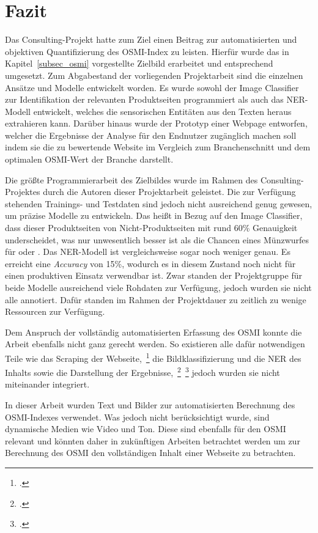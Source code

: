 \section{Fazit}
Das Consulting-Projekt hatte zum Ziel einen Beitrag zur automatisierten und objektiven Quantifizierung des
\ac{OSMI}-Index zu leisten.
Hierfür wurde das in Kapitel~\ref{subsec_osmi} vorgestellte Zielbild erarbeitet und entsprechend umgesetzt.
Zum Abgabestand der vorliegenden Projektarbeit sind die einzelnen Ansätze und Modelle entwickelt worden.
Es wurde sowohl der Image Classifier zur Identifikation der relevanten Produktseiten programmiert als auch das \ac{NER}-Modell
entwickelt, welches die sensorischen Entitäten aus den Texten heraus extrahieren kann.
Darüber hinaus wurde der Prototyp einer Webpage entworfen, welcher die Ergebnisse der Analyse
für den Endnutzer zugänglich machen soll indem sie die zu bewertende Website im Vergleich zum Branchenschnitt und dem optimalen \ac{OSMI}-Wert
der Branche darstellt.

Die größte Programmierarbeit des Zielbildes wurde im Rahmen des Consulting-Projektes durch die Autoren dieser Projektarbeit
geleistet.
Die zur Verfügung stehenden Trainings- und Testdaten sind jedoch nicht ausreichend genug gewesen, um präzise Modelle
zu entwickeln.
Das heißt in Bezug auf den Image Classifier, dass dieser Produktseiten von Nicht-Produktseiten mit rund 60\% Genauigkeit underscheidet,
was nur unwesentlich besser ist als die Chancen eines Münzwurfes für \grqq{} oder \grqq{}.
Das \ac{NER}-Modell ist vergleichsweise sogar noch weniger genau. Es erreicht eine \textit{Accuracy} von 15\%,
wodurch es in diesem Zustand noch nicht für einen produktiven Einsatz verwendbar ist. 
Zwar standen der Projektgruppe für beide Modelle ausreichend viele Rohdaten zur Verfügung, jedoch wurden sie nicht alle annotiert. Dafür standen im Rahmen der Projektdauer zu zeitlich zu
wenige Ressourcen zur Verfügung.

Dem Anspruch der vollständig automatisierten Erfassung des \ac{OSMI} konnte die Arbeit ebenfalls nicht ganz gerecht werden. So existieren alle dafür notwendigen Teile wie das Scraping der Webseite,~\footcite[\vglf][]{ostkamp2022a} die Bildklassifizierung und die \acl{NER} des Inhalts sowie die Darstellung der Ergebnisse,~\footcite[\vglf][]{ostkamp2022b}~\footcite[\vglf][]{ostkamp2022c}
jedoch wurden sie nicht miteinander integriert.

In dieser Arbeit wurden Text und Bilder zur automatisierten Berechnung des \ac{OSMI}-Indexes verwendet. Was jedoch nicht berücksichtigt wurde, sind dynamische Medien wie Video und Ton.
Diese sind ebenfalls für den OSMI relevant und könnten daher in zukünftigen Arbeiten betrachtet werden um zur Berechnung des OSMI den vollständigen Inhalt einer Webseite zu betrachten.

